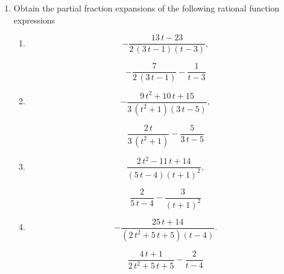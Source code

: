 \documentclass[oneside,10pt]{memoir}
\newcounter{pass}
\begin{document}
\begin{enumerate}
\setcounter{enumi}{\value{pass}}
\item
Obtain the partial fraction expansions of the following rational function expressions
\begin{enumerate}
\item
$$-\frac{13 \, t - 23}{2 \, {\left(3 \, t - 1\right)} {\left(t - 3\right)}},$$
\begin{solution}
$$-\frac{7}{2 \, {\left(3 \, t - 1\right)}} - \frac{1}{t - 3}$$
\end{solution}
\item
$$-\frac{9 \, t^{2} + 10 \, t + 15}{3 \, {\left(t^{2} + 1\right)} {\left(3 \, t - 5\right)}},$$
\begin{solution}
$$\frac{2 \, t}{3 \, {\left(t^{2} + 1\right)}} - \frac{5}{3 \, t - 5}$$
\end{solution}
\item
$$\frac{2 \, t^{2} - 11 \, t + 14}{{\left(5 \, t - 4\right)} {\left(t + 1\right)}^{2}},$$
\begin{solution}
$$\frac{2}{5 \, t - 4} - \frac{3}{{\left(t + 1\right)}^{2}}$$
\end{solution}
\item
$$-\frac{25 \, t + 14}{{\left(2 \, t^{2} + 5 \, t + 5\right)} {\left(t - 4\right)}}.$$
\begin{solution}
$$\frac{4 \, t + 1}{2 \, t^{2} + 5 \, t + 5} - \frac{2}{t - 4}$$
\end{solution}
\end{enumerate}
\end{enumerate}
\end{document}
